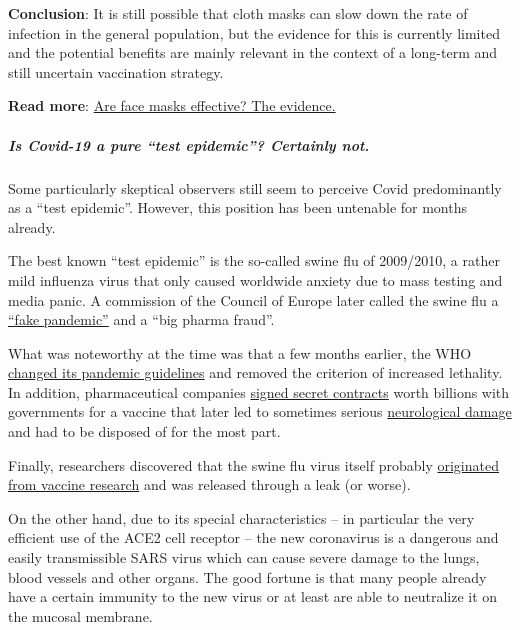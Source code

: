 \textbf{Conclusion}: It is still possible that cloth masks can slow down
the rate of infection in the general population, but the evidence for
this is currently limited and the potential benefits are mainly relevant
in the context of a long-term and still uncertain vaccination strategy.

\textbf{Read more}: \href{https://swprs.org/face-masks-evidence/}{Are
face masks effective? The evidence.}

\hypertarget{is-covid-19-a-pure-test-epidemic-certainly-not}{%
\subparagraph{\texorpdfstring{\textbf{Is Covid-19 a pure ``test
epidemic''? Certainly
not.}}{Is Covid-19 a pure ``test epidemic''? Certainly not.}}\label{is-covid-19-a-pure-test-epidemic-certainly-not}}

Some particularly skeptical observers still seem to perceive Covid
predominantly as a ``test epidemic''. However, this position has been
untenable for months already.

The best known ``test epidemic'' is the so-called swine flu of
2009/2010, a rather mild influenza virus that only caused worldwide
anxiety due to mass testing and media panic. A commission of the Council
of Europe later called the swine flu a
\href{https://www.forbes.com/2010/02/05/world-health-organization-swine-flu-pandemic-opinions-contributors-michael-fumento.html\#658c006c48e8}{``fake
pandemic''} and a ``big pharma fraud''.

What was noteworthy at the time was that a few months earlier, the WHO
\href{https://www.forbes.com/2010/02/05/world-health-organization-swine-flu-pandemic-opinions-contributors-michael-fumento.html\#658c006c48e8}{changed
its pandemic guidelines} and removed the criterion of increased
lethality. In addition, pharmaceutical companies
\href{https://www.dailymail.co.uk/news/article-1242147/The-false-pandemic-Drug-firms-cashed-scare-swine-flu-claims-Euro-health-chief.html}{signed
secret contracts} worth billions with governments for a vaccine that
later led to sometimes serious
\href{https://www.ibtimes.co.uk/brain-damaged-uk-victims-swine-flu-vaccine-get-60-million-compensation-1438572}{neurological
damage} and had to be disposed of for the most part.

Finally, researchers discovered that the swine flu virus itself probably
\href{https://link.springer.com/article/10.1186/1743-422X-6-207}{originated
from vaccine research} and was released through a leak (or worse).

On the other hand, due to its special characteristics -- in particular
the very efficient use of the ACE2 cell receptor -- the new coronavirus
is a dangerous and easily transmissible SARS virus which can cause
severe damage to the lungs, blood vessels and other organs. The good
fortune is that many people already have a certain immunity to the new
virus or at least are able to neutralize it on the mucosal membrane.

